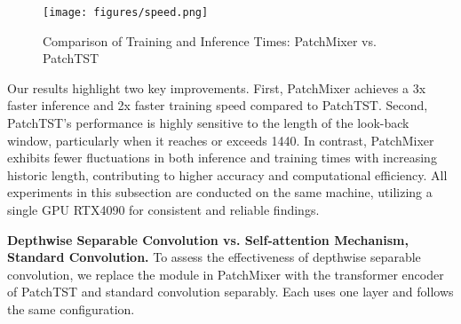 \documentclass{article} \usepackage{iclr2024_conference,times}
\begin{document}
\begin{figure}[h]
\begin{center}
\texttt{[image: figures/speed.png]}
\end{center}
\caption{Comparison of Training and Inference Times: PatchMixer vs. PatchTST}
\label{fig::speed}
\end{figure}

Our results highlight two key improvements. First, PatchMixer achieves a 3x faster inference and 2x faster training speed compared to PatchTST. Second, PatchTST's performance is highly sensitive to the length of the look-back window, particularly when it reaches or exceeds 1440. In contrast, PatchMixer exhibits fewer fluctuations in both inference and training times with increasing historic length, contributing to higher accuracy and computational efficiency. All experiments in this subsection are conducted on the same machine, utilizing a single GPU RTX4090 for consistent and reliable findings.

\textbf{Depthwise Separable Convolution vs. Self-attention Mechanism, Standard Convolution.} To assess the effectiveness of depthwise separable convolution, we replace the module in PatchMixer with the transformer encoder of PatchTST and standard convolution separably. Each uses one layer and follows the same configuration. 
\end{document}
